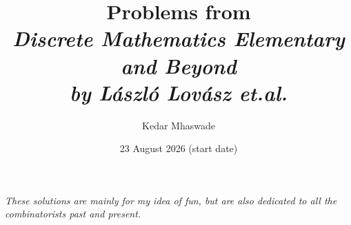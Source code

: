 \documentclass[11pt]{book}
\title{Problems from \\ \emph{Discrete Mathematics {\small Elementary and Beyond}}
\\ \emph{by L\'aszl\'o Lov\'asz et.al. \cite{lovasz-etal}}
\\ }
\author{Kedar Mhaswade}
\date{23 August 2026\tiny{ (start date)}}
\theoremstyle{definition}
\theoremstyle{plain}
\theoremstyle{definition}
\theoremstyle{problemstyle}
\theoremstyle{remark}
\theoremstyle{definition}
\begin{document}
\maketitle
\tableofcontents
\newpage
\cleardoublepage
\chapter*{}
\thispagestyle{empty} %

\vspace*{\fill} %

\begin{center}
    \textit{These solutions are mainly for my idea of fun, but are also dedicated to all the combinatorists past and present.}
\end{center}

\vspace*{\fill} %
\cleardoublepage
\end{document}
